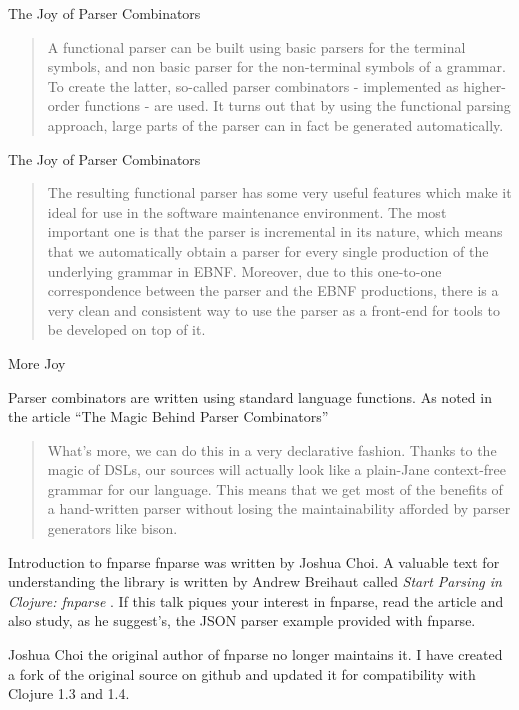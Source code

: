 \documentclass[presentation]{beamer}
\begin{document}
\begin{frame}{The Joy of Parser Combinators}
\begin{quotation}
 A functional parser can be built using basic parsers for the terminal
 symbols, and non basic parser for the non-terminal symbols of a
 grammar. To create the latter, so-called parser combinators -
 implemented as higher-order functions - are used. It turns out that by
 using the functional parsing approach, large parts of the parser can
 in fact be generated automatically.
\end{quotation}
\end{frame}

\begin{frame}{The Joy of Parser Combinators}
\begin{quotation}
 The resulting functional parser has some very useful features which
 make it ideal for use in the software maintenance environment. The
 most important one is that the parser is incremental in its nature,
 which means that we automatically obtain a parser for every single
 production of the underlying grammar in EBNF. Moreover, due to this
 one-to-one correspondence between the parser and the EBNF productions,
 there is a very clean and consistent way to use the parser as a
 front-end for tools to be developed on top of it.\cite{Baumann}
\end{quotation}
\end{frame}

\begin{frame}{More Joy}

  Parser combinators are written using standard language functions. As
  noted in the article ``The Magic Behind Parser Combinators''\cite{Spiewak}

\begin{quotation}
  What's more, we can do this in a very declarative fashion.  Thanks
  to the magic of DSLs, our sources will actually look like a
  plain-Jane context-free grammar for our language.  This means that
  we get most of the benefits of a hand-written parser without losing
  the maintainability afforded by parser generators like bison.
\end{quotation}
\end{frame}

\begin{frame}{Introduction to fnparse}
  fnparse \cite{Choi} was written by Joshua Choi. A valuable text for
  understanding the library is written by Andrew Breihaut called
  \emph{Start Parsing in Clojure: fnparse} \cite{Breihaut}.  If this
  talk piques your interest in fnparse, read the article and also
  study, as he suggest's, the JSON parser example provided with
  fnparse.

  Joshua Choi the original author of fnparse no longer maintains it. I
  have created a fork of the original source on github and updated it
  for compatibility with Clojure 1.3 and 1.4.
\end{frame}
\end{document}
